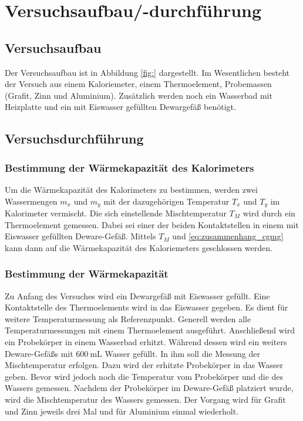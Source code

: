 \section{Versuchsaufbau/-durchführung}

\subsection{Versuchsaufbau}

Der Versuchsaufbau ist in Abbildung \ref{fig:} dargestellt.
Im Wesentlichen besteht der Versuch aus einem Kaloriemeter, einem Thermoelement,
Probemassen (Grafit, Zinn und Aluminium).
Zusätzlich werden noch ein Wasserbad mit Heizplatte und
ein mit Eiswasser gefüllten Dewargefäß benötigt.

\subsection{Versuchsdurchführung}

\subsubsection{Bestimmung der Wärmekapazität des Kalorimeters}
Um die Wärmekapazität des Kalorimeters zu bestimmen, werden 
zwei Wassermengen $m_x$ und $m_y$ mit der dazugehörigen Temperatur $T_x$ und $T_y$ 
im Kalorimeter vermischt. 
Die sich einstellende Mischtemperatur $T_M$ wird durch ein Thermoelement gemessen.
Dabei sei einer der beiden Kontaktstellen
in einem mit Eiswasser gefüllten Deware-Gefäß.
Mittels $T_M$ und \eqref{eq:zusammenhang_cgmg} kann dann auf die Wärmekapazität des 
Kaloriemeters geschlossen werden.

\subsubsection{Bestimmung der Wärmekapazität}
Zu Anfang des Versuches wird ein Dewargefäß mit Eiswasser gefüllt.
Eine Kontaktstelle des Thermoelements wird in das Eiswasser gegeben.
Es dient für weitere Temperaturmessung als Referenzpunkt.
Generell werden alle Temperaturmessungen mit einem Thermoelement ausgeführt.
Anschließend wird ein Probekörper in einem Wasserbad erhitzt.
Während dessen wird ein weiters Deware-Gefäßs mit $\SI{600}{\milli\liter}$ Wasser gefüllt.
In ihm soll die Messung der Mischtemperatur erfolgen.
Dazu wird der erhitzte Probekörper in das Wasser geben.
Bevor wird jedoch noch die Temperatur vom Probekörper und die des Wassers gemessen.
Nachdem der Probekörper im Deware-Gefäß platziert wurde, wird die Mischtemperatur des
Wassers gemessen. Der Vorgang wird für Grafit und Zinn jeweils drei Mal und für
Aluminium einmal wiederholt.


